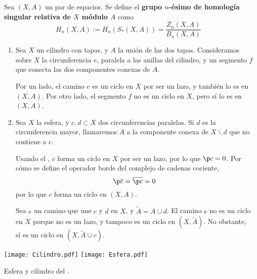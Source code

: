 \begin{definition}
Sea $(X,A)$ un par de espacios. Se define el \textbf{grupo $n$-ésimo de
homología singular relativa de $X$ módulo $A$} como
\[H_n(X,A):=H_n(S_*(X,A))=\frac{Z_n(X,A)}{B_n(X,A)}\]
\end{definition}


\begin{example}
\begin{enumerate}
\item Sea $X$ un cilindro con tapas, y $A$ la unión de las dos tapas.
Consideramos sobre $X$ la circunferencia $e$, paralela a las anillas del
cilindro, y un segmento $f$ que conecta las dos componentes conexas de $A$.

Por un lado, el camino $e$ es un ciclo en $X$ por ser un lazo, y también lo
es en $(X,A)$. Por otro lado, el segmento $f$ no es un ciclo en $X$, pero
sí lo es en $(X,A)$.
\item Sea $X$ la esfera, y $c,d \subset X$ dos circunferencias paralelas. Si
$d$ es la circunferencia mayor, llamaremos $A$ a la componente conexa de $X
\backslash d$ que no contiene a $c$.

Usando el , $c$ forma un ciclo en $X$ por ser un
lazo, por lo que $\p c=0$. Por cómo se define el operador borde del complejo
de cadenas cociente,
\[\p\overline c=\overline{\p c}=0\]
por lo que $c$ forma un ciclo en $(X,A)$.

Sea $e$ un camino que une $c$ y $d$ en $X$, y $\tilde{A}=A\cup d$. El camino
$e$ no es un ciclo en $X$ porque no es un lazo, y tampoco es un ciclo en
$(X,\tilde{A})$. No obstante, sí es un ciclo en $(X,\tilde{A}\cup c)$.
\end{enumerate}
\end{example}

\begin{marginfigure}
\texttt{[image: Cilindro.pdf]}
\texttt{[image: Esfera.pdf]}
\caption{Esfera y cilindro del . }
\end{marginfigure}

